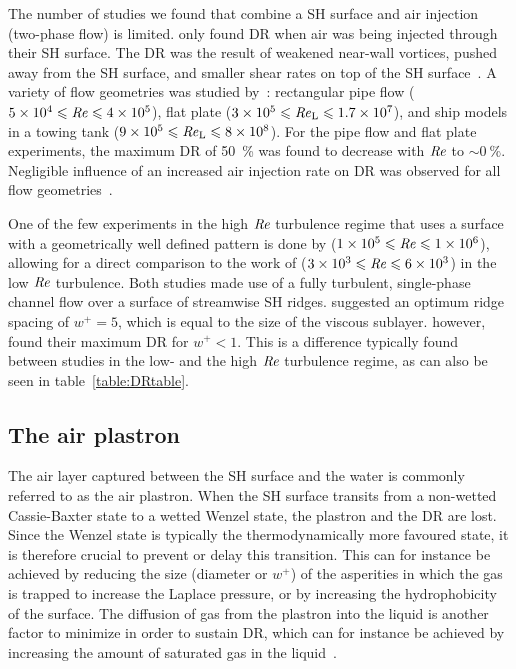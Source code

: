 The number of studies we found that combine a SH surface and air injection (two-phase flow) is limited. \cite{Du2017} only found DR when air was being injected through their SH surface. The DR was the result of weakened near-wall vortices, pushed away from the SH surface, and smaller shear rates on top of the SH surface~\citep{Du2017}. A variety of flow geometries was studied by~\cite{Fukuda2000}: rectangular pipe flow ($5\times 10^4 \leqslant \mbox{\textit{Re}} \leqslant 4 \times 10^5$), flat plate ($3\times 10^5 \leqslant \mbox{\textit{Re}}_\text{L} \leqslant 1.7 \times 10^7$), and ship models in a towing tank ($9\times 10^5 \leqslant \mbox{\textit{Re}}_\text{L} \leqslant 8 \times 10^8$). For the pipe flow and flat plate experiments, the maximum DR of \SI{50}{\percent} was found to decrease with $\mbox{\textit{Re}}$ to $\sim \SI{0}{\percent}$. Negligible influence of an increased air injection rate on DR was observed for all flow geometries~\citep{Fukuda2000}.

One of the few experiments in the high $\mbox{\textit{Re}}$ turbulence regime that uses a surface with a geometrically well defined pattern is done by \cite{Park2014} ($1\times 10^5 \leqslant \mbox{\textit{Re}} \leqslant 1 \times 10^6$), allowing for a direct comparison to the work of \cite{Daniello2009} ($3\times 10^3 \leqslant \mbox{\textit{Re}} \leqslant 6 \times 10^3$) in the low $\mbox{\textit{Re}}$ turbulence. Both studies made use of a fully turbulent, single-phase channel flow  over a surface of streamwise SH ridges. \cite{Daniello2009} suggested an optimum ridge spacing of $w^+ = 5$, which is equal to the size of the viscous sublayer. \cite{Park2014} however, found their maximum DR for $w^+ < 1$. This is a difference typically found between studies in the low- and the high $\mbox{\textit{Re}}$ turbulence regime, as can also be seen in table~\ref{table:DRtable}.

\subsection{The air plastron}
The air layer captured between the SH surface and the water is commonly referred to as the air plastron. When the SH surface transits from a non-wetted Cassie-Baxter state to a wetted Wenzel state, the plastron and the DR are lost. Since the Wenzel state is typically the thermodynamically more favoured state, it is therefore crucial to prevent or delay this transition. This can for instance be achieved by reducing the size (diameter or $w^+$) of the asperities in which the gas is trapped to increase the Laplace pressure, or by increasing the hydrophobicity of the surface. The diffusion of gas from the plastron into the liquid is another factor to minimize in order to sustain DR, which can for instance be achieved by increasing the amount of saturated gas in the liquid~\citep{Lv2014,Xiang2017}.


